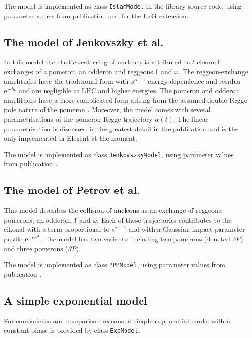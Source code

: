 \documentclass[preprint,12pt]{elsarticle}
\def\class#1{{\tt #1}}
\def\e{{\rm e}}
\begin{document}
The model is implemented as class \class{IslamModel} in the library source code, using parameter values from publication \cite{islam06} and \cite{islam09} for the LxG extension.

\subsection{The model of Jenkovszky et al.}

In this model \cite{jenkovszky11} the elastic scattering of nucleons is attributed to $t$-channel exchanges of a pomeron, an odderon and reggeons $\rm f$ and $\omega$. The reggeon-exchange amplitudes have the traditional form with $s^{\alpha - 1}$ energy dependence and residua $\e^{-bt}$ and are negligible at LHC and higher energies. The pomeron and odderon amplitudes have a more complicated form arising from the assumed double Regge pole nature of the pomeron \cite[section 2]{jenkovszky86}. Moreover, the model comes with several parametrisations of the pomeron Regge trajectory $\alpha(t)$. The linear parametrisation is discussed in the greatest detail in the publication and is the only implemented in Elegent at the moment. 

The model is implemented as class \class{JenkovszkyModel}, using parameter values from publication \cite{jenkovszky11}.

\subsection{The model of Petrov et al.}

This model \cite{petrov02} describes the collision of nucleons as an exchange of reggeons: pomerons, an odderon, $\rm f$ and $\omega$. Each of these trajectories contributes to the eikonal with a term proportional to $s^{\alpha - 1}$ and with a Gaussian impact-parameter profile $\e^{-c b^2}$. The model has two variants: including two pomerons (denoted {\em 2P}\/) and three pomerons ({\em 3P}\/).

The model is implemented as class \class{PPPModel}, using parameter values from publication \cite{petrov02}.

\subsection{A simple exponential model}

For convenience and comparison reasons, a simple exponential model with a constant phase is provided by class \class{ExpModel}.
\end{document}
